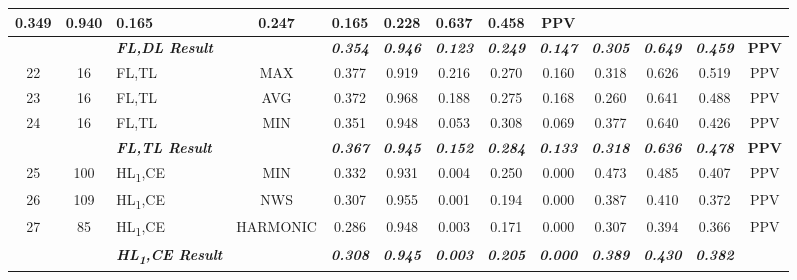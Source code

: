 \begin{table}[H]
{\begin{tabular}{cc|l|c|c|c|c|c|c|c|c|c|c|}
    0.349 &
    0.940 &
    0.165 &
    0.247 &
    0.165 &
    0.228 &
    0.637 &
    0.458 &
    PPV \\ \hline
  \textbf{} &
    \textit{\textbf{}} &
    \textit{\textbf{FL,DL Result}} &
    \textbf{} &
    \textit{\textbf{0.354}} &
    \textit{\textbf{0.946}} &
    \textit{\textbf{0.123}} &
    \textit{\textbf{0.249}} &
    \textit{\textbf{0.147}} &
    \textit{\textbf{0.305}} &
    \textit{\textbf{0.649}} &
    \textit{\textbf{0.459}} &
    \textbf{PPV} \\ \hline
  \multicolumn{1}{|c|}{22} &
    16 &
    FL,TL &
    MAX &
    0.377 &
    0.919 &
    0.216 &
    0.270 &
    0.160 &
    0.318 &
    0.626 &
    0.519 &
    PPV \\ \hline
  \multicolumn{1}{|c|}{23} &
    16 &
    FL,TL &
    AVG &
    0.372 &
    0.968 &
    0.188 &
    0.275 &
    0.168 &
    0.260 &
    0.641 &
    0.488 &
    PPV \\ \hline
  \multicolumn{1}{|c|}{24} &
    16 &
    FL,TL &
    MIN &
    0.351 &
    0.948 &
    0.053 &
    0.308 &
    0.069 &
    0.377 &
    0.640 &
    0.426 &
    PPV \\ \hline
  \textbf{} &
    \textit{\textbf{}} &
    \textit{\textbf{FL,TL Result}} &
    \textbf{} &
    \textit{\textbf{0.367}} &
    \textit{\textbf{0.945}} &
    \textit{\textbf{0.152}} &
    \textit{\textbf{0.284}} &
    \textit{\textbf{0.133}} &
    \textit{\textbf{0.318}} &
    \textit{\textbf{0.636}} &
    \textit{\textbf{0.478}} &
    \textbf{PPV} \\ \hline
  \multicolumn{1}{|c|}{25} &
    100 &
    HL\textsubscript{1},CE &
    MIN &
    0.332 &
    0.931 &
    0.004 &
    0.250 &
    0.000 &
    0.473 &
    0.485 &
    0.407 &
    PPV \\ \hline
  \multicolumn{1}{|c|}{26} &
    109 &
    HL\textsubscript{1},CE &
    NWS &
    0.307 &
    0.955 &
    0.001 &
    0.194 &
    0.000 &
    0.387 &
    0.410 &
    0.372 &
    PPV \\ \hline
  \multicolumn{1}{|c|}{27} &
    85 &
    HL\textsubscript{1},CE &
    HARMONIC &
    0.286 &
    0.948 &
    0.003 &
    0.171 &
    0.000 &
    0.307 &
    0.394 &
    0.366 &
    PPV \\ \hline
   &
    \textit{\textbf{}} &
    \textit{\textbf{HL\textsubscript{1},CE Result}} &
     &
    \textit{\textbf{0.308}} &
    \textit{\textbf{0.945}} &
    \textit{\textbf{0.003}} &
    \textit{\textbf{0.205}} &
    \textit{\textbf{0.000}} &
    \textit{\textbf{0.389}} &
    \textit{\textbf{0.430}} &
    \textit{\textbf{0.382}} &

\end{tabular}}
\end{table}
